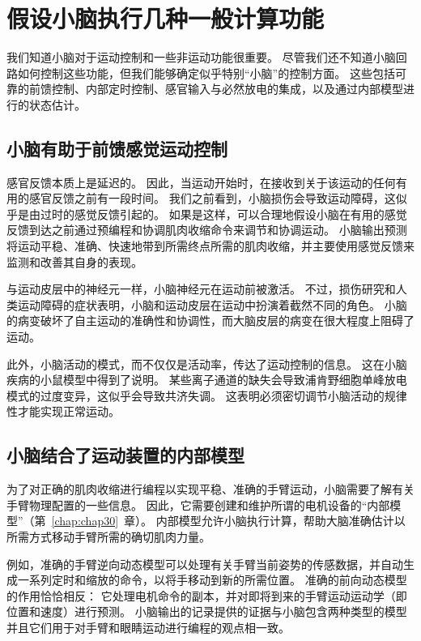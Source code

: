 \section{假设小脑执行几种一般计算功能}

我们知道小脑对于运动控制和一些非运动功能很重要。
尽管我们还不知道小脑回路如何控制这些功能，但我们能够确定似乎特别“小脑”的控制方面。
这些包括可靠的前馈控制、内部定时控制、感官输入与必然放电的集成，以及通过内部模型进行的状态估计。



\subsection{小脑有助于前馈感觉运动控制}

感官反馈本质上是延迟的。
因此，当运动开始时，在接收到关于该运动的任何有用的感官反馈之前有一段时间。
我们之前看到，小脑损伤会导致运动障碍，这似乎是由过时的感觉反馈引起的。
如果是这样，可以合理地假设小脑在有用的感觉反馈到达之前通过预编程和协调肌肉收缩命令来调节和协调运动。
小脑输出预测将运动平稳、准确、快速地带到所需终点所需的肌肉收缩，并主要使用感觉反馈来监测和改善其自身的表现。


与运动皮层中的神经元一样，小脑神经元在运动前被激活。
不过，损伤研究和人类运动障碍的症状表明，小脑和运动皮层在运动中扮演着截然不同的角色。
小脑的病变破坏了自主运动的准确性和协调性，而大脑皮层的病变在很大程度上阻碍了运动。


此外，小脑活动的模式，而不仅仅是活动率，传达了运动控制的信息。
这在小脑疾病的小鼠模型中得到了说明。
某些离子通道的缺失会导致浦肯野细胞单峰放电模式的过度变异，这似乎会导致共济失调。
这表明必须密切调节小脑活动的规律性才能实现正常运动。



\subsection{小脑结合了运动装置的内部模型}

为了对正确的肌肉收缩进行编程以实现平稳、准确的手臂运动，小脑需要了解有关手臂物理配置的一些信息。
因此，它需要创建和维护所谓的电机设备的“内部模型”（第~\ref{chap:chap30}~章）。
内部模型允许小脑执行计算，帮助大脑准确估计以所需方式移动手臂所需的确切肌肉力量。


例如，准确的手臂逆向动态模型可以处理有关手臂当前姿势的传感数据，并自动生成一系列定时和缩放的命令，以将手移动到新的所需位置。
准确的前向动态模型的作用恰恰相反：
它处理电机命令的副本，并对即将到来的手臂运动运动学（即位置和速度）进行预测。 小脑输出的记录提供的证据与小脑包含两种类型的模型并且它们用于对手臂和眼睛运动进行编程的观点相一致。


